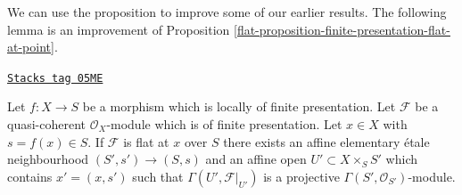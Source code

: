 We can use the proposition to improve some of our earlier results.
The following lemma is an improvement of
Proposition \ref{flat-proposition-finite-presentation-flat-at-point}.

\begin{lemma}
\label{flat-lemma-flat-finite-presentation-affine-neighbourhood-projective}
\href{https://stacks.math.columbia.edu/tag/05ME}{\texttt{Stacks tag 05ME}}

Let $f : X \to S$ be a morphism which is locally of finite presentation.
Let $\mathcal{F}$ be a quasi-coherent $\mathcal{O}_X$-module which is
of finite presentation. Let $x \in X$ with $s = f(x) \in S$.
If $\mathcal{F}$ is flat at $x$ over $S$ there exists an affine
elementary \'etale neighbourhood $(S', s') \to (S, s)$ and
an affine open $U' \subset X \times_S S'$ which contains $x' = (x, s')$
such that $\Gamma(U', \mathcal{F}|_{U'})$ is a projective
$\Gamma(S', \mathcal{O}_{S'})$-module.
\end{lemma}

